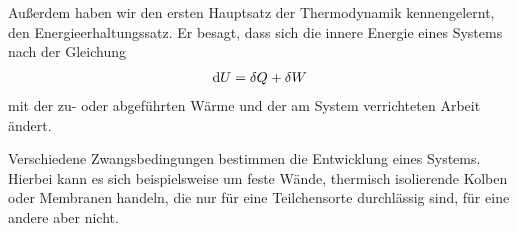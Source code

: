 \begin{summary}
    Außerdem haben wir den ersten Hauptsatz der Thermodynamik kennengelernt, den Energieerhaltungssatz. Er besagt, dass sich die innere Energie eines Systems nach der Gleichung 
    \begin{align}
        \mathop{}\!\mathrm{d} U = \mathop{}\!\delta Q + \mathop{}\!\delta W
    \end{align}
    mit der zu- oder abgeführten Wärme und der am System verrichteten Arbeit ändert. 


    Verschiedene Zwangsbedingungen bestimmen die Entwicklung eines Systems. Hierbei kann es sich beispielsweise um feste Wände, thermisch isolierende Kolben oder Membranen handeln, die nur für eine Teilchensorte durchlässig sind, für eine andere aber nicht. 
\end{summary}